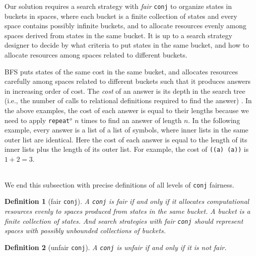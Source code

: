 \documentclass[acmlarge, review=true]{acmart}
\newcommand{\conj}{\texttt{conj}}
\newcommand{\repeato}{\texttt{repeat$^o$}}
\newcommand{\BFS}[0]{BFS}
\newtheorem{defn}{Definition}[section]
\begin{document}
\begin{center}
	\begin{tabular}{c}
		
	\end{tabular}
\end{center}

Our solution requires a search strategy with \emph{fair} \conj{} to organize
states in buckets in spaces, where each bucket is a finite collection of states
and every space contains possibly infinite buckets,
and 
to allocate resources evenly among spaces derived from states in the 
same bucket. It is up to a search strategy designer to decide by what criteria 
to 
put states in the same bucket, and how to allocate resources among spaces 
related to different buckets.

\BFS{} puts states of the same cost in the same bucket, and allocates
resources carefully among spaces related to different buckets such
that it produces answers in increasing order of cost. The \emph{cost}
of an answer is its depth in the search tree (i.e., the number of
calls to relational definitions required to find the answer) 
\citep{seres1999algebra}. In the above examples, the cost of each answer is 
equal to their lengths because we need to apply \repeato{} $n$ times to find an 
answer of length $n$. In the following example, every answer is a list of a 
list of symbols, where inner lists in the same outer list are identical. Here 
the cost of each answer is equal to the length of its inner lists plus the 
length of its outer list. For example, the cost of \texttt{((a) (a))} is $1 + 2 
= 3$.

\begin{center}
	\begin{tabular}{c}
		
	\end{tabular}
\end{center}
 
We end this subsection with precise definitions of all levels of \conj{} 
fairness.

\begin{defn}[fair \conj{}]
A \conj{} is fair if and only if it allocates computational resources evenly to 
spaces produced from states in the same bucket. A bucket is a finite 
collection of states. And search strategies with fair \conj{} should represent 
spaces with possibly unbounded collections of buckets. 
\end{defn}

\begin{defn}[unfair \conj{}]
A \conj{} is unfair if and only if it is not fair.
\end{defn}
\end{document}
